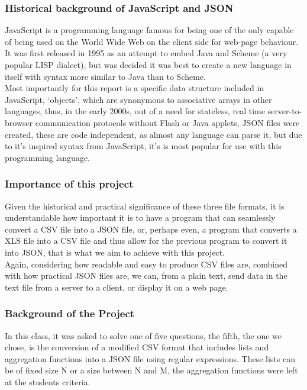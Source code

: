 \documentclass[11pt,a4paper,times]{report}
\begin{document}
\subsubsection*{Historical background of JavaScript and JSON}JavaScript
is a programming language famous for being one of the only capable of
being used on the World Wide Web on the client side for web-page behaviour.
It was first released in 1995 as an attempt to embed Java and Scheme
(a very popular LISP dialect), but was decided it was best to create
a new language in itself with syntax more similar to Java than to Scheme.
\\
Most importantly for this report is a specific data structure included in 
JavaScript, `objects', which are synonymous to associative arrays
in other languages, thus, in the early 2000s, out of a need for stateless,
real time server-to-browser communication protocols without Flash or
Java applets, JSON files were created, these are code independent,
as almost any language can parse it, but due to it's inspired syntax from
JavaScript, it's is most popular for use with this programming language.

\subsubsection*{Importance of this project}Given the historical and
practical significance of these three file formats, it is understandable
how important it is to have a program that can seamlessly convert a CSV
file into a JSON file, or, perhaps even, a program that converts a XLS 
file into a CSV file and thus allow for the previous program to convert 
it into JSON, that is what we aim to achieve with this project.
\\
Again, considering how readable and easy to produce CSV files are,
combined with how practical JSON files are, we can, from a plain text,
send data in the text file from a server to a client, or display it on a 
web page.


\subsubsection*{Background of the Project}In this class, it was asked to
solve one of five questions, the fifth, the one we chose, is the 
conversion of a modified CSV format that includes lists and aggregation 
functions into a JSON file using regular expressions. These lists can be
of fixed size N or a size between N and M, the aggregation functions were
left at the students criteria.
\end{document}
